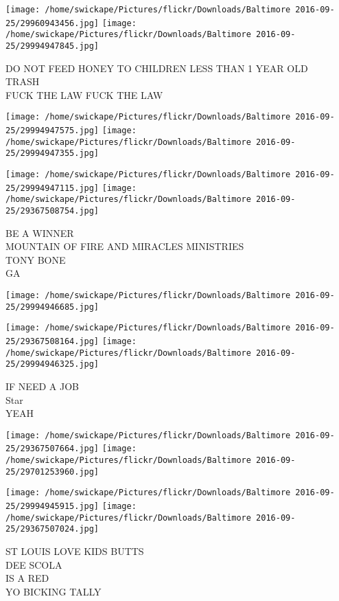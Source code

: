 \documentclass[10pt,letterpaper]{article}
\begin{document}
\vspace{0.25in}
\texttt{[image: /home/swickape/Pictures/flickr/Downloads/Baltimore 2016-09-25/29960943456.jpg]}
\texttt{[image: /home/swickape/Pictures/flickr/Downloads/Baltimore 2016-09-25/29994947845.jpg]}

DO NOT FEED HONEY TO CHILDREN LESS THAN 1 YEAR OLD\\
TRASH\\
FUCK THE LAW FUCK THE LAW
\pagebreak

\texttt{[image: /home/swickape/Pictures/flickr/Downloads/Baltimore 2016-09-25/29994947575.jpg]}
\texttt{[image: /home/swickape/Pictures/flickr/Downloads/Baltimore 2016-09-25/29994947355.jpg]}

\texttt{[image: /home/swickape/Pictures/flickr/Downloads/Baltimore 2016-09-25/29994947115.jpg]}
\texttt{[image: /home/swickape/Pictures/flickr/Downloads/Baltimore 2016-09-25/29367508754.jpg]}

BE A WINNER\\
MOUNTAIN OF FIRE AND MIRACLES MINISTRIES\\
TONY BONE\\
GA
\pagebreak

\texttt{[image: /home/swickape/Pictures/flickr/Downloads/Baltimore 2016-09-25/29994946685.jpg]}

\vspace{0.25in}
\texttt{[image: /home/swickape/Pictures/flickr/Downloads/Baltimore 2016-09-25/29367508164.jpg]}
\texttt{[image: /home/swickape/Pictures/flickr/Downloads/Baltimore 2016-09-25/29994946325.jpg]}

IF NEED A JOB\\
Star\\
YEAH
\pagebreak

\texttt{[image: /home/swickape/Pictures/flickr/Downloads/Baltimore 2016-09-25/29367507664.jpg]}
\texttt{[image: /home/swickape/Pictures/flickr/Downloads/Baltimore 2016-09-25/29701253960.jpg]}

\texttt{[image: /home/swickape/Pictures/flickr/Downloads/Baltimore 2016-09-25/29994945915.jpg]}
\texttt{[image: /home/swickape/Pictures/flickr/Downloads/Baltimore 2016-09-25/29367507024.jpg]}

ST LOUIS LOVE KIDS BUTTS\\
DEE SCOLA\\
IS A RED\\
YO BICKING TALLY
\pagebreak
\end{document}
